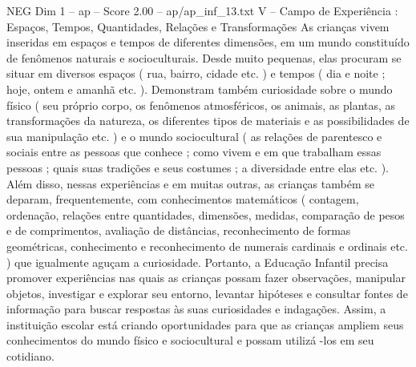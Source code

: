 \begin{textsample}{NEG Dim 1 – ap – Score 2.00 – ap/ap\_inf\_13.txt}  \label{ex:f1_neg_122}
V – Campo de Experiência : Espaços, Tempos, Quantidades, Relações e Transformações As crianças vivem inseridas em espaços e tempos de diferentes dimensões, em um mundo constituído de fenômenos naturais e socioculturais.
Desde muito pequenas, elas procuram se situar em diversos espaços ( rua, bairro, cidade etc. ) e tempos ( dia e noite ; hoje, ontem e amanhã etc. ).
Demonstram também curiosidade sobre o mundo físico ( seu próprio corpo, os fenômenos atmosféricos, os animais, as plantas, as transformações da natureza, os diferentes tipos de materiais e as possibilidades de sua manipulação etc. ) e o mundo sociocultural ( as relações de parentesco e sociais entre as pessoas que conhece ; como vivem e em que trabalham essas pessoas ; quais suas tradições e seus costumes ; a diversidade entre elas etc. ).
Além disso, nessas experiências e em muitas outras, as crianças também se deparam, frequentemente, com conhecimentos matemáticos ( contagem, ordenação, relações entre quantidades, dimensões, medidas, comparação de pesos e de comprimentos, avaliação de distâncias, reconhecimento de formas geométricas, conhecimento e reconhecimento de numerais cardinais e ordinais etc. ) que igualmente aguçam a curiosidade.
Portanto, a Educação Infantil precisa promover experiências nas quais as crianças possam fazer observações, manipular objetos, investigar e explorar seu entorno, levantar hipóteses e consultar fontes de informação para buscar respostas às suas curiosidades e indagações.
Assim, a instituição escolar está criando oportunidades para que as crianças ampliem seus conhecimentos do mundo físico e sociocultural e possam utilizá -los em seu cotidiano.

\end{textsample}
